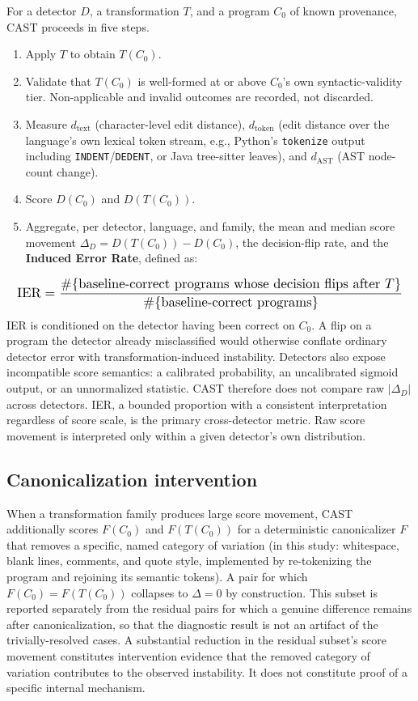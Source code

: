 \documentclass[10pt,conference]{IEEEtran}
\begin{document}
For a detector $D$, a transformation $T$, and a program $C_0$ of known provenance, CAST proceeds in five steps.
\begin{enumerate}
\item Apply $T$ to obtain $T(C_0)$.
\item Validate that $T(C_0)$ is well-formed at or above $C_0$'s own syntactic-validity tier. Non-applicable and invalid outcomes are recorded, not discarded.
\item Measure $d_\text{text}$ (character-level edit distance), $d_\text{token}$ (edit distance over the language's own lexical token stream, e.g., Python's \texttt{tokenize} output including \texttt{INDENT}/\texttt{DEDENT}, or Java tree-sitter leaves), and $d_\text{AST}$ (AST node-count change).
\item Score $D(C_0)$ and $D(T(C_0))$.
\item Aggregate, per detector, language, and family, the mean and median score movement $\Delta_D = D(T(C_0)) - D(C_0)$, the decision-flip rate, and the \textbf{Induced Error Rate}, defined as:
\end{enumerate}
\begin{equation}
\resizebox{0.99\columnwidth}{!}{$\displaystyle
\text{IER} = \frac{\#\{\text{baseline-correct programs whose decision flips after } T\}}{\#\{\text{baseline-correct programs}\}}
$}
\end{equation}
IER is conditioned on the detector having been correct on $C_0$. A flip on a program the detector already misclassified would otherwise conflate ordinary detector error with transformation-induced instability. Detectors also expose incompatible score semantics: a calibrated probability, an uncalibrated sigmoid output, or an unnormalized statistic. CAST therefore does not compare raw $|\Delta_D|$ across detectors. IER, a bounded proportion with a consistent interpretation regardless of score scale, is the primary cross-detector metric. Raw score movement is interpreted only within a given detector's own distribution.

\subsection{Canonicalization intervention}

When a transformation family produces large score movement, CAST additionally scores $F(C_0)$ and $F(T(C_0))$ for a deterministic canonicalizer $F$ that removes a specific, named category of variation (in this study: whitespace, blank lines, comments, and quote style, implemented by re-tokenizing the program and rejoining its semantic tokens). A pair for which $F(C_0){=}F(T(C_0))$ collapses to $\Delta{=}0$ by construction. This subset is reported separately from the residual pairs for which a genuine difference remains after canonicalization, so that the diagnostic result is not an artifact of the trivially-resolved cases. A substantial reduction in the residual subset's score movement constitutes intervention evidence that the removed category of variation contributes to the observed instability. It does not constitute proof of a specific internal mechanism.
\end{document}
